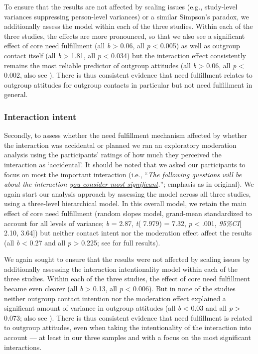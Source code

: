 To ensure that the results are not affected by scaling issues (e.g.,
study-level variances suppressing person-level variances) or a similar
Simpson's paradox, we additionally assess the model within each of the
three studies. Within each of the three studies, the effects are more
pronounced, so that we also see a significant effect of core need
fulfillment (all \textit{b} \textgreater{} 0.06, all \textit{p}
\textless{} 0.005) as well as outgroup contact itself (all
\textbar{}\textit{b}\textbar{} \textgreater{} 1.81, all \textit{p}
\textless{} 0.034) but the interaction effect consistently remains the
most reliable predictor of outgroup attitudes (all
\textbar{}\textit{b}\textbar{} \textgreater{} 0.06, all \textit{p}
\textless{} 0.002, also see ). There is
thus consistent evidence that need fulfillment relates to outgroup
attitudes for outgroup contacts in particular but not need fulfillment
in general.

\subsubsection{Interaction intent}

Secondly, to assess whether the need fulfillment mechanism affected by
whether the interaction was accidental or planned we ran an exploratory
moderation analysis using the participants' ratings of how much they
perceived the interaction as `accidental'. It should be noted that we
asked our participants to focus on most the important interaction (i.e.,
``\textit{The following questions will be about the interaction \underline{you consider most significant}.}'';
emphasis as in original). We again start our analysis approach by
assessing the model across all three studies, using a three-level
hierarchical model. In this overall model, we retain the main effect of
core need fulfillment (random slopes model, grand-mean standardized to
account for all levels of variance; \textit{b} = 2.87, \textit{t}(
7.979) = 7.32, \textit{p} \textless{} .001, \textit{95\%CI}{[} 2.10,
3.64{]}) but neither contact intent nor the moderation effect affect the
results (all \textbar{}\textit{b}\textbar{} \textless{} 0.27 and all
\textit{p} \textgreater{} 0.225; see  for
full results).

We again sought to ensure that the results were not affected by scaling
issues by additionally assessing the interaction intentionality model
within each of the three studies. Within each of the three studies, the
effect of core need fulfillment became even clearer (all
\textbar{}\textit{b}\textbar{} \textgreater{} 0.13, all \textit{p}
\textless{} 0.006). But in none of the studies neither outgroup contact
intention nor the moderation effect explained a significant amount of
variance in outgroup attitudes (all \textbar{}\textit{b}\textbar{}
\textless{} 0.03 and all \textit{p} \textgreater{} 0.073; also see
). There is thus consistent evidence that
need fulfillment is related to outgroup attitudes, even when taking the
intentionality of the interaction into account --- at least in our three
samples and with a focus on the most significant interactions.

